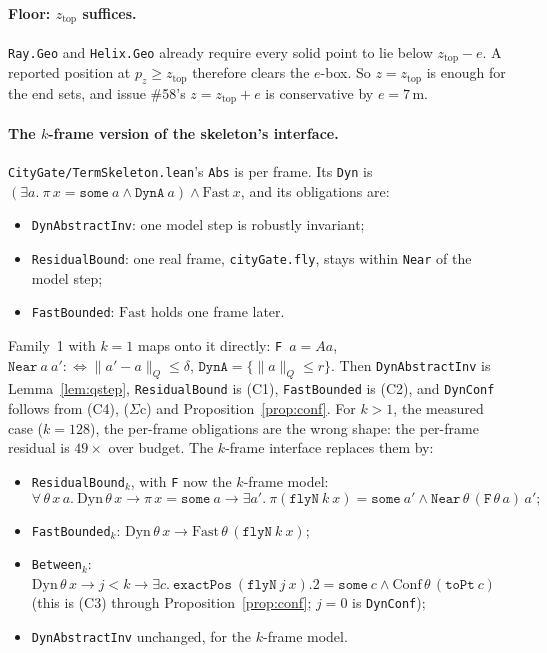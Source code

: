 \documentclass[11pt]{article}
\theoremstyle{definition}
\newcommand{\Conf}{\ensuremath{\mathrm{Conf}}}
\newcommand{\Dyn}{\ensuremath{\mathrm{Dyn}}}
\newcommand{\Fast}{\ensuremath{\mathrm{Fast}}}
\newcommand{\zTop}{z_{\mathrm{top}}}
\newcommand{\nQ}[1]{\|#1\|_Q}
\begin{document}
\paragraph{Floor: $\zTop$ suffices.} \texttt{Ray.Geo} and \texttt{Helix.Geo} already require every solid point to lie below $\zTop - e$. A reported position at $p_z \ge \zTop$ therefore clears the $e$-box. So $z = \zTop$ is enough for the end sets, and issue \#58's $z = \zTop + e$ is conservative by $e = 7$\,m.

\paragraph{The $k$-frame version of the skeleton's interface.} \texttt{CityGate/TermSkeleton.lean}'s \texttt{Abs} is per frame. Its \texttt{Dyn} is $(\exists a.\ \pi\,x = \texttt{some}\ a \wedge \texttt{DynA}\ a) \wedge \Fast\ x$, and its obligations are:
\begin{itemize}
\item \texttt{DynAbstractInv}: one model step is robustly invariant;
\item \texttt{ResidualBound}: one real frame, \texttt{cityGate.fly}, stays within \texttt{Near} of the model step;
\item \texttt{FastBounded}: $\Fast$ holds one frame later.
\end{itemize}
Family~1 with $k = 1$ maps onto it directly: \texttt{F}~$a = A a$, $\texttt{Near}\ a\ a' :\iff \nQ{a' - a} \le \delta$, $\texttt{DynA} = \{\nQ{a} \le r\}$. Then \texttt{DynAbstractInv} is Lemma~\ref{lem:qstep}, \texttt{ResidualBound} is (C1), \texttt{FastBounded} is (C2), and \texttt{DynConf} follows from (C4), ($\Sigma$c) and Proposition~\ref{prop:conf}. For $k > 1$, the measured case ($k = 128$), the per-frame obligations are the wrong shape: the per-frame residual is $49\times$ over budget. The $k$-frame interface replaces them by:
\begin{itemize}
\item \texttt{ResidualBound}$_k$, with \texttt{F} now the $k$-frame model:
\[ \forall\,\theta\,x\,a.\ \Dyn\,\theta\,x \to \pi\,x = \texttt{some}\ a \to \exists a'.\ \pi(\texttt{flyN}\ k\ x) = \texttt{some}\ a' \wedge \texttt{Near}\,\theta\,(\texttt{F}\,\theta\,a)\,a'; \]
\item \texttt{FastBounded}$_k$: $\Dyn\,\theta\,x \to \Fast\,\theta\,(\texttt{flyN}\ k\ x)$;
\item \texttt{Between}$_k$: $\Dyn\,\theta\,x \to j < k \to \exists c.\ \texttt{exactPos}\ (\texttt{flyN}\ j\ x).2 = \texttt{some}\ c \wedge \Conf\,\theta\,(\texttt{toPt}\ c)$ (this is (C3) through Proposition~\ref{prop:conf}; $j = 0$ is \texttt{DynConf});
\item \texttt{DynAbstractInv} unchanged, for the $k$-frame model.
\end{itemize}
\end{document}
